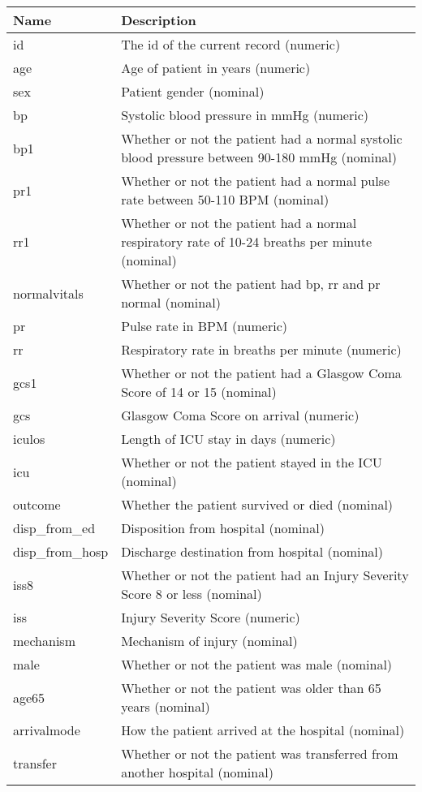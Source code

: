 \renewcommand{\arraystretch}{0.7}
\begin{longtable}{lp{13cm}}
\textbf{Name} & \textbf{Description} \\ 
\hline
id & The id of the current record (numeric) \\ 
age & Age of patient in years (numeric) \\ 
sex & Patient gender (nominal) \\ 
bp & Systolic blood pressure in mmHg (numeric) \\ 
bp1 & Whether or not the patient had a normal systolic blood pressure between 90-180 mmHg (nominal) \\ 
pr1 & Whether or not the patient had a normal pulse rate between 50-110 BPM (nominal) \\ 
rr1 & Whether or not the patient had a normal respiratory rate of 10-24 breaths per minute (nominal) \\ 
normalvitals & Whether or not the patient had bp, rr and pr normal (nominal) \\ 
pr & Pulse rate in BPM (numeric) \\ 
rr & Respiratory rate in breaths per minute (numeric) \\ 
gcs1 & Whether or not the patient had a Glasgow Coma Score of 14 or 15 (nominal) \\ 
gcs & Glasgow Coma Score on arrival (numeric) \\ 
iculos & Length of ICU stay in days (numeric) \\ 
icu & Whether or not the patient stayed in the ICU (nominal) \\ 
outcome & Whether the patient survived or died (nominal) \\ 
disp\_from\_ed & Disposition from hospital (nominal) \\ 
disp\_from\_hosp & Discharge destination from hospital (nominal) \\ 
iss8 & Whether or not the patient had an Injury Severity Score 8 or less (nominal) \\ 
iss & Injury Severity Score (numeric) \\ 
mechanism & Mechanism of injury (nominal) \\ 
male & Whether or not the patient was male (nominal) \\ 
age65 & Whether or not the patient was older than 65 years (nominal) \\ 
arrivalmode & How the patient arrived at the hospital (nominal) \\ 
transfer & Whether or not the patient was transferred from another hospital (nominal) \\ 

\end{longtable}
